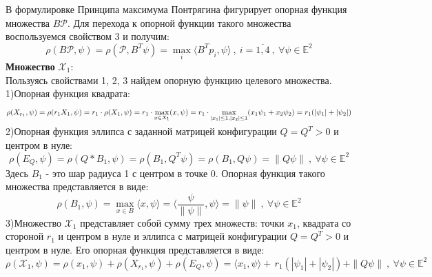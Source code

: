 \documentclass[10pt]{article}
\begin{document}
В формулировке Принципа максимума Понтрягина фигурирует опорная функция множества \(B \mathcal{P} \). Для перехода к опорной функции такого множества воспользуемся свойством 3 и получим:
\[ \rho(B \mathcal{P}, \psi) = \rho(\mathcal{P}, B^T \psi) = \max\limits_{i} \langle B^T p_i, \psi \rangle \ , \ i = \overline{1,4} \ , \ \forall \psi \in \mathbb{E}^2\]
\textbf{Множество} \( \mathcal{X}_1\):\smallskip\\
Пользуясь свойствами 1, 2, 3 найдем опорную функцию целевого множества.\medskip\\
1)Опорная функция квадрата: 
\[ \rho (X_{r_1},\psi) = \rho(r_1 X_1, \psi) = r_1 \cdot \rho(X_1, \psi) = r_1 \cdot  \smash{\displaystyle\max_{x \in X_1}} ( x, \psi) = r_1 \cdot \smash{\displaystyle\max_{|x_1| \leq 1, |x_2| \leq 1}}(x_1 \psi_1 + x_2 \psi_2) =  r_1(|\psi_1| + |\psi_2|) \bigskip\]
2)Опорная функция эллипса с заданной матрицей конфигурации \(Q = Q^T > 0\) и центром в нуле:
\[ \rho(E_Q, \psi) = \rho(Q * B_1, \psi) = \rho(B_1, Q^T \psi) = \rho(B_1, Q\psi) = \|Q\psi\| \ , \ \forall \psi \in \mathbb{E}^2 \]
Здесь \( B_1 \) - это шар радиуса 1 с центром в точке 0. Опорная функция такого множества представляется в виде:
\[ \rho(B_1, \psi) = \max\limits_{x \in B} \langle x, \psi \rangle  =  \langle \frac{\psi}{ \| \psi \| }, \psi \rangle  = \| \psi \| \ , \ \forall \psi \in \mathbb{E}^2\]
3)Множество \( \mathcal{X}_1\) представляет собой сумму трех множеств: точки \( x_1\), квадрата со стороной \(r_1\) и центром в нуле и эллипса с матрицей конфигурации \( Q = Q^T > 0\) и центром в нуле. Его опорная функция представляется в виде:
\[ \rho(\mathcal{X}_1, \psi) = \rho(x_1, \psi) + \rho(X_{r_1}, \psi) + \rho(E_Q, \psi) =  \langle x_1, \psi \rangle + \, r_1 (|\psi_1| + |\psi_2|) + \|Q\psi\| \ , \ \forall \psi \in \mathbb{E}^2\]
\end{document}
